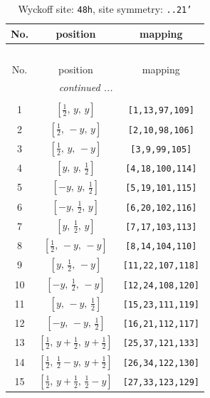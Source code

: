 \documentclass[fleqn,8pt]{jsarticle}
\begin{document}
\begin{longtable}{ccc}
\caption{Wyckoff site: {\tt 48h}, site symmetry: {\tt ..21'}}
 \\
 \hline \hline
No. & position & mapping \\ \hline \endfirsthead

\multicolumn{2}{l}{\tablename\ \thetable{}} \\
 \hline \hline
No. & position & mapping \\ \hline \endhead

 \hline \hline
\multicolumn{2}{r}{\footnotesize\it continued ...} \\ \endfoot

 \hline \hline
\multicolumn{2}{r}{} \\ \endlastfoot

1 & $\left[ \frac{1}{2},\, y,\, y \right]$ & {\tt [1,13,97,109]} \\ \hline
2 & $\left[ \frac{1}{2},\, - y,\, y \right]$ & {\tt [2,10,98,106]} \\ \hline
3 & $\left[ \frac{1}{2},\, y,\, - y \right]$ & {\tt [3,9,99,105]} \\ \hline
4 & $\left[ y,\, y,\, \frac{1}{2} \right]$ & {\tt [4,18,100,114]} \\ \hline
5 & $\left[ - y,\, y,\, \frac{1}{2} \right]$ & {\tt [5,19,101,115]} \\ \hline
6 & $\left[ - y,\, \frac{1}{2},\, y \right]$ & {\tt [6,20,102,116]} \\ \hline
7 & $\left[ y,\, \frac{1}{2},\, y \right]$ & {\tt [7,17,103,113]} \\ \hline
8 & $\left[ \frac{1}{2},\, - y,\, - y \right]$ & {\tt [8,14,104,110]} \\ \hline
9 & $\left[ y,\, \frac{1}{2},\, - y \right]$ & {\tt [11,22,107,118]} \\ \hline
10 & $\left[ - y,\, \frac{1}{2},\, - y \right]$ & {\tt [12,24,108,120]} \\ \hline
11 & $\left[ y,\, - y,\, \frac{1}{2} \right]$ & {\tt [15,23,111,119]} \\ \hline
12 & $\left[ - y,\, - y,\, \frac{1}{2} \right]$ & {\tt [16,21,112,117]} \\ \hline
13 & $\left[ \frac{1}{2},\, y + \frac{1}{2},\, y + \frac{1}{2} \right]$ & {\tt [25,37,121,133]} \\ \hline
14 & $\left[ \frac{1}{2},\, \frac{1}{2} - y,\, y + \frac{1}{2} \right]$ & {\tt [26,34,122,130]} \\ \hline
15 & $\left[ \frac{1}{2},\, y + \frac{1}{2},\, \frac{1}{2} - y \right]$ & {\tt [27,33,123,129]} \\ \hline

\end{longtable}
\end{document}
